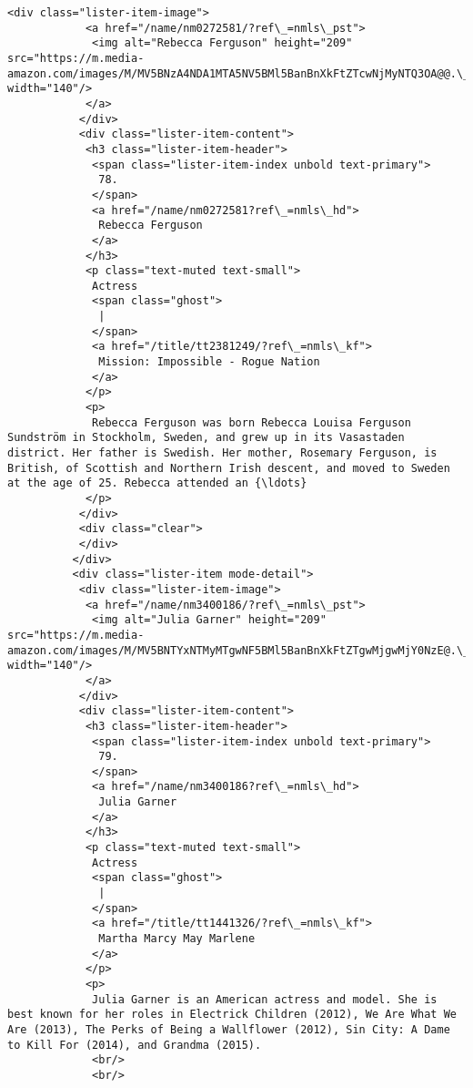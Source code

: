 \documentclass[11pt]{article}
\begin{document}
\begin{Verbatim}[commandchars=\\\{\}]
           <div class="lister-item-image">
            <a href="/name/nm0272581/?ref\_=nmls\_pst">
             <img alt="Rebecca Ferguson" height="209" src="https://m.media-amazon.com/images/M/MV5BNzA4NDA1MTA5NV5BMl5BanBnXkFtZTcwNjMyNTQ3OA@@.\_V1\_UY209\_CR4,0,140,209\_AL\_.jpg" width="140"/>
            </a>
           </div>
           <div class="lister-item-content">
            <h3 class="lister-item-header">
             <span class="lister-item-index unbold text-primary">
              78.
             </span>
             <a href="/name/nm0272581?ref\_=nmls\_hd">
              Rebecca Ferguson
             </a>
            </h3>
            <p class="text-muted text-small">
             Actress
             <span class="ghost">
              |
             </span>
             <a href="/title/tt2381249/?ref\_=nmls\_kf">
              Mission: Impossible - Rogue Nation
             </a>
            </p>
            <p>
             Rebecca Ferguson was born Rebecca Louisa Ferguson Sundström in Stockholm, Sweden, and grew up in its Vasastaden district. Her father is Swedish. Her mother, Rosemary Ferguson, is British, of Scottish and Northern Irish descent, and moved to Sweden at the age of 25. Rebecca attended an {\ldots}
            </p>
           </div>
           <div class="clear">
           </div>
          </div>
          <div class="lister-item mode-detail">
           <div class="lister-item-image">
            <a href="/name/nm3400186/?ref\_=nmls\_pst">
             <img alt="Julia Garner" height="209" src="https://m.media-amazon.com/images/M/MV5BNTYxNTMyMTgwNF5BMl5BanBnXkFtZTgwMjgwMjY0NzE@.\_V1\_UY209\_CR33,0,140,209\_AL\_.jpg" width="140"/>
            </a>
           </div>
           <div class="lister-item-content">
            <h3 class="lister-item-header">
             <span class="lister-item-index unbold text-primary">
              79.
             </span>
             <a href="/name/nm3400186?ref\_=nmls\_hd">
              Julia Garner
             </a>
            </h3>
            <p class="text-muted text-small">
             Actress
             <span class="ghost">
              |
             </span>
             <a href="/title/tt1441326/?ref\_=nmls\_kf">
              Martha Marcy May Marlene
             </a>
            </p>
            <p>
             Julia Garner is an American actress and model. She is best known for her roles in Electrick Children (2012), We Are What We Are (2013), The Perks of Being a Wallflower (2012), Sin City: A Dame to Kill For (2014), and Grandma (2015).
             <br/>
             <br/>

\end{Verbatim}
\end{document}

